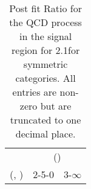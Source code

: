 \begin{table}[h!]
\tiny
\centering
\caption{Post fit Ratio for the QCD process in the signal region for 2.1\ifb for symmetric categories. All entries are non-zero but are truncated to one decimal place.\label{tab:ratioseppost_sig_qcd_sym}}
\begin{tabular}
{ccc}
	\hline\hline
	& \multicolumn{2}{c}{\scalht (\gev)} \\ 
	 (\njet,  \nb) & 2-5-0 & 3-$\infty$ \\ [0.8ex] 
\hline
	\hline
	\hline
\end{tabular}
\end{table}
